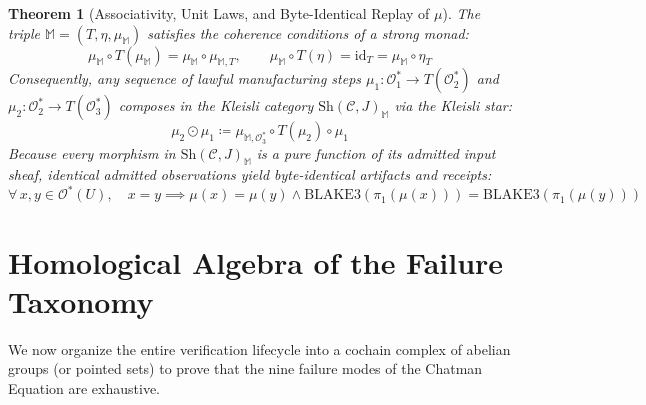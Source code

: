 \documentclass[10pt,twoside,openany]{book}
\theoremstyle{plain}
\newtheorem{theorem}{Theorem}[chapter]
\theoremstyle{definition}
\theoremstyle{remark}
\newcommand{\Oadm}{\mathcal{O}^*}
\begin{document}
\begin{theorem}[Associativity, Unit Laws, and Byte-Identical Replay of $\mu$]
The triple $\mathbb{M} = (T, \eta, \mu_{\mathbb{M}})$ satisfies the coherence conditions of a strong monad:
\begin{equation}
\mu_{\mathbb{M}} \circ T(\mu_{\mathbb{M}}) = \mu_{\mathbb{M}} \circ \mu_{\mathbb{M}, T}, \qquad \mu_{\mathbb{M}} \circ T(\eta) = \mathrm{id}_T = \mu_{\mathbb{M}} \circ \eta_T
\end{equation}
Consequently, any sequence of lawful manufacturing steps $\mu_1: \Oadm_1 \to T(\Oadm_2)$ and $\mu_2: \Oadm_2 \to T(\Oadm_3)$ composes in the Kleisli category $\mathrm{Sh}(\mathcal{C}, J)_{\mathbb{M}}$ via the Kleisli star:
\begin{equation}
\mu_2 \odot \mu_1 \coloneqq \mu_{\mathbb{M}, \Oadm_3} \circ T(\mu_2) \circ \mu_1
\end{equation}
Because every morphism in $\mathrm{Sh}(\mathcal{C}, J)_{\mathbb{M}}$ is a pure function of its admitted input sheaf, identical admitted observations yield byte-identical artifacts and receipts:
\begin{equation}
\forall\, x, y \in \Oadm(U),\quad x = y \implies \mu(x) = \mu(y) \land \mathrm{BLAKE3}(\pi_1(\mu(x))) = \mathrm{BLAKE3}(\pi_1(\mu(y)))
\end{equation}
\end{theorem}

\section{Homological Algebra of the Failure Taxonomy}
We now organize the entire verification lifecycle into a cochain complex of abelian groups (or pointed sets) to prove that the nine failure modes of the Chatman Equation are exhaustive.
\end{document}
